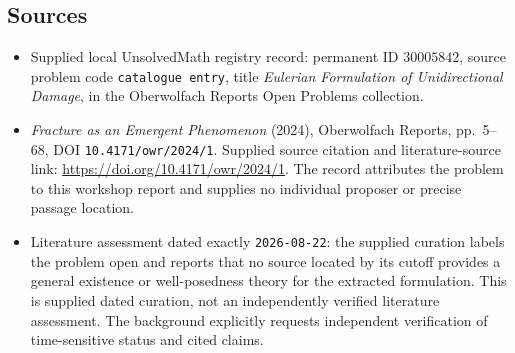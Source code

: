\documentclass[11pt]{article}
\begin{document}
\subsection{Sources}
\begin{itemize}
\item Supplied local UnsolvedMath registry record: permanent ID \(30005842\), source problem code \texttt{catalogue entry}, title \emph{Eulerian Formulation of Unidirectional Damage}, in the Oberwolfach Reports Open Problems collection.
\item \emph{Fracture as an Emergent Phenomenon} (2024), Oberwolfach Reports, pp.~5--68, DOI \texttt{10.4171/owr/2024/1}. Supplied source citation and literature-source link: \url{https://doi.org/10.4171/owr/2024/1}. The record attributes the problem to this workshop report and supplies no individual proposer or precise passage location.
\item Literature assessment dated exactly \texttt{2026-08-22}: the supplied curation labels the problem open and reports that no source located by its cutoff provides a general existence or well-posedness theory for the extracted formulation. This is supplied dated curation, not an independently verified literature assessment. The background explicitly requests independent verification of time-sensitive status and cited claims.
\end{itemize}
\end{document}
